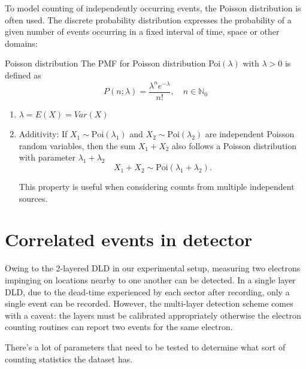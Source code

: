 To model counting of independently occurring events, the Poisson distribution is often used. The discrete probability distribution expresses the probability of a given number of events occurring in a fixed interval of time, space or other domains\cite{fellerIntroductionProbabilityTheory1968}:
\begin{note}
    {Poisson distribution}
    The \gls{PMF} for Poisson distribution Poi\((\lambda)\) with \(\lambda > 0\) is defined as
    \begin{equation}
        P(n;\lambda) = \frac{\lambda^n e^{-\lambda}}{n!}, \quad n \in \mathbb{N}_0
    \end{equation}
    \begin{enumerate}
        \item $\lambda = E(X) = Var(X)$ 
        \item Additivity: If $X_1 \sim \text{Poi}(\lambda_1)$ and $X_2 \sim \text{Poi}(\lambda_2)$ are independent Poisson random variables, then the sum $X_1 + X_2$ also follows a Poisson distribution with parameter $\lambda_1 + \lambda_2$
        \begin{equation}
            X_1 + X_2 \sim \text{Poi}(\lambda_1 + \lambda_2).
        \end{equation}
        
        This property is useful when considering counts from multiple independent sources.
    \end{enumerate}
\end{note}


\section{Correlated events in detector}
Owing to the 2-layered \gls{DLD} in our experimental setup, measuring two electrons impinging on locations nearby to one another can be detected. In a single layer \gls{DLD}, due to the dead-time experienced by each sector after recording, only a single event can be recorded. However, the multi-layer detection scheme comes with a caveat: the layers must be calibrated appropriately otherwise the electron counting routines can report two events for the same electron. 



There's a lot of parameters that need to be tested to determine what sort of counting statistics the dataset has.

